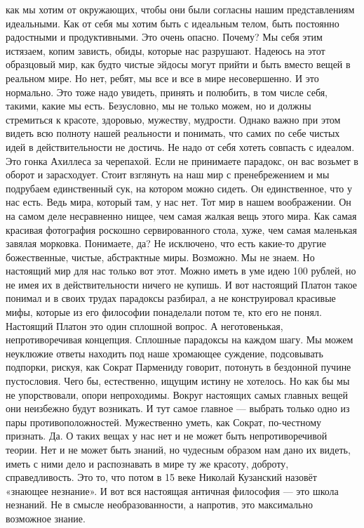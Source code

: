 как мы хотим от окружающих, чтобы они были согласны нашим представлениям
идеальными. Как от себя мы хотим быть с идеальным телом, быть постоянно
радостными и продуктивными. Это очень опасно. Почему? Мы себя этим истязаем,
копим зависть, обиды, которые нас разрушают. Надеюсь на этот образцовый мир, как
будто чистые эйдосы могут прийти и быть вместо вещей в реальном мире. Но нет,
ребят, мы все и все в мире несовершенно. И это нормально. Это тоже надо увидеть,
принять и полюбить, в том числе себя, такими, какие мы есть. Безусловно, мы не
только можем, но и должны стремиться к красоте, здоровью, мужеству, мудрости.
Однако важно при этом видеть всю полноту нашей реальности и понимать, что самих
по себе чистых идей в действительности не достичь. Не надо от себя хотеть
совпасть с идеалом. Это гонка Ахиллеса за черепахой. Если не принимаете
парадокс, он вас возьмет в оборот и зарасходует. Стоит взглянуть на наш мир с
пренебрежением и мы подрубаем единственный сук, на котором можно сидеть. Он
единственное, что у нас есть. Ведь мира, который там, у нас нет. Тот мир в нашем
воображении. Он на самом деле несравненно нищее, чем самая жалкая вещь этого
мира. Как самая красивая фотография роскошно сервированного стола, хуже, чем
самая маленькая завялая морковка. Понимаете, да? Не исключено, что есть какие-то
другие божественные, чистые, абстрактные миры. Возможно. Мы не знаем. Но
настоящий мир для нас только вот этот. Можно иметь в уме идею 100 рублей, но не
имея их в действительности ничего не купишь. И вот настоящий Платон такое
понимал и в своих трудах парадоксы разбирал, а не конструировал красивые мифы,
которые из его философии понаделали потом те, кто его не понял. Настоящий Платон
это один сплошной вопрос. А неготовенькая, непротиворечивая концепция. Сплошные
парадоксы на каждом шагу. Мы можем неуклюжие ответы находить под наше хромающее
суждение, подсовывать подпорки, рискуя, как Сократ Пармениду говорит, потонуть в
бездонной пучине пустословия. Чего бы, естественно, ищущим истину не хотелось.
Но как бы мы не упорствовали, опори непроходимы. Вокруг настоящих самых главных
вещей они неизбежно будут возникать. И тут самое главное — выбрать только одно
из пары противоположностей. Мужественно уметь, как Сократ, по-честному признать.
Да. О таких вещах у нас нет и не может быть непротиворечивой теории. Нет и не
может быть знаний, но чудесным образом нам дано их видеть, иметь с ними дело и
распознавать в мире ту же красоту, доброту, справедливость. Это то, что потом в
15 веке Николай Кузанский назовёт «знающее незнание». И вот вся настоящая
античная философия — это школа незнаний. Не в смысле необразованности, а
напротив, это максимально возможное знание.

